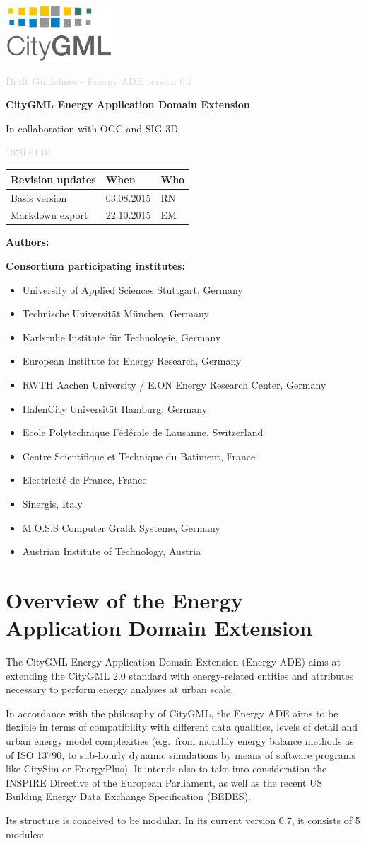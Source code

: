\documentclass[a4paper,12pt]{article}
\let\stdsection\section%
\renewcommand\section{\newpage\stdsection}
\renewcommand\maketitle{%
\sffamily
\begin{flushright}
\includegraphics[width=4cm]{./fig/logo.png}
\end{flushright}
    \thispagestyle{titlepage}
    \vspace{3.4cm}
    {\noindent \textcolor{lightgray}{Draft Guidelines - Energy ADE version 0.7} \par}
    \vspace{0.3cm}
    {\noindent \large \bfseries CityGML Energy Application Domain Extension \par}
    \vspace{0.7cm}
    {\noindent In collaboration with OGC and SIG 3D \par}
    \vspace{0.7cm}
    {\noindent \textcolor{lightgray}{\today} \par}
\newpage
\begin{flushleft}
\begin{tabular}{lll}
    \toprule
    \textbf{Revision updates} & \textbf{When} & \textbf{Who}\\
    \midrule
    Basis version &
    03.08.2015 &
    RN
\\
    Markdown export &
    22.10.2015 &
    EM
    \\
    \bottomrule
\end{tabular}
\end{flushleft}
\textbf{Authors:}\\
{\noindent \normalsize \normalfont%
}
\par
\vspace{0.3cm}
\textbf{Consortium participating institutes:}
\begin{itemize}
    \itemsep-1.3em
    \item University of Applied Sciences Stuttgart, Germany\\\item Technische Universität München, Germany\\\item Karlsruhe Institute für Technologie, Germany\\\item European Institute for Energy Research, Germany\\\item RWTH Aachen University / E.ON Energy Research Center, Germany\\\item HafenCity Universität Hamburg, Germany\\\item Ecole Polytechnique Fédérale de Lausanne, Switzerland\\\item Centre Scientifique et Technique du Batiment, France\\\item Electricité de France, France\\\item Sinergis, Italy\\\item M.O.S.S Computer Grafik Systeme, Germany\\\item Austrian Institute of Technology, Austria
\end{itemize}
\newpage
}
\begin{document}
\pagestyle{titlepage}
\maketitle
\pagestyle{normalpage}
\begin{abstract}
The Energy Application Domain Extension (Energy ADE) described in this
documentation defines a standardized data model based on the CityGML 2.0
format for urban energy analyses, aiming to be a reference exchange data
model between different urban modelling tools and expert databases.

The Energy ADE has been developed since May 2014 by an international
consortium of urban energy simulation developers and users, both
academic and commercial. To date, the consortium is composed by:
University of Applied Sciences Stuttgart, Technische Universität
München, Karlsruhe Institute für Technologie, RWTH Aachen University /
E.ON Energy Research Center, HafenCity Universität Hamburg, European
Institute for Energy Research, Ecole Polytechnique Fédérale de Lausanne,
Centre Scientifique et Technique du Batiment, Electricité de France,
Sinergis, M.O.S.S Computer Grafik Systeme and Austrian Institute of
Technology.
\end{abstract}
\newpage
\pagestyle{normalpage}


\hypersetup{linkcolor=black}
\tableofcontents
\newpage
\section{Overview of the Energy Application Domain
Extension}\label{overview-of-the-energy-application-domain-extension}

The CityGML Energy Application Domain Extension (Energy ADE) aims at
extending the CityGML 2.0 standard with energy-related entities and
attributes necessary to perform energy analyses at urban scale.

In accordance with the philosophy of CityGML, the Energy ADE aims to be
flexible in terms of compatibility with different data qualities, levels
of detail and urban energy model complexities (e.g.~from monthly energy
balance methods as of ISO 13790, to sub-hourly dynamic simulations by
means of software programs like CitySim or EnergyPlus). It intends also
to take into consideration the INSPIRE Directive of the European
Parliament, as well as the recent US Building Energy Data Exchange
Specification (BEDES).

Its structure is conceived to be modular. In its current version 0.7, it
consists of 5 modules:
\end{document}
